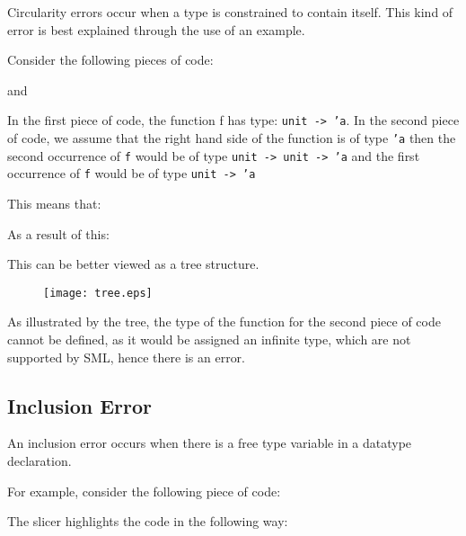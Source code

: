 \documentclass{report}
\begin{document}
\begin{itemize}
\subitem Circularity errors occur when a type is constrained to
contain itself. This kind of error is best explained through the use
of an example.

Consider the following pieces of code:


and


In the first piece of code, the function f has type:
\texttt{unit -> 'a}.  In the second piece of code, we assume
that the right hand side of the function is of type \texttt{'a}
then the second occurrence of \texttt{f} would be of type
\texttt{unit -> unit -> 'a} and the first occurrence of
\texttt{f} would be of type \texttt{unit -> 'a}

This means that:


As a result of this:


This can be better viewed as a tree structure.

\begin{figure}[!h]
\begin{center}
\texttt{[image: tree.eps]}
\end{center}
\end{figure}

As illustrated by the tree, the type of the function for the second
piece of code cannot be defined, as it would be assigned an infinite
type, which are not supported by SML, hence there is an error.

\newpage


\subsection{Inclusion Error}

\subitem An inclusion error occurs when there is a free type variable
in a datatype declaration.

For example, consider the following piece of code:


The slicer highlights the code in the following way:


\end{itemize}
\end{document}
